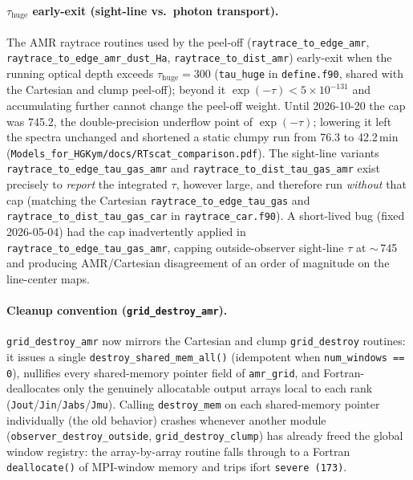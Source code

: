 \documentclass[english,a4paper]{my_memo}
\begin{document}
\begin{sloppypar}
\paragraph{$\tau_\mathrm{huge}$ early-exit (sight-line vs.\ photon
transport).}  The AMR raytrace routines used by the peel-off
(\texttt{raytrace\_to\_edge\_amr}, \texttt{raytrace\_to\_edge\_amr\_dust\_Ha},
\texttt{raytrace\_to\_dist\_amr}) early-exit when the running optical
depth exceeds $\tau_\mathrm{huge}=300$ (\texttt{tau\_huge} in
\texttt{define.f90}, shared with the Cartesian and clump peel-off);
beyond it $\exp(-\tau)<5\times10^{-131}$ and accumulating further cannot
change the peel-off weight.  Until 2026-10-20 the cap was 745.2, the
double-precision underflow point of $\exp(-\tau)$; lowering it left the
spectra unchanged and shortened a static clumpy run from 76.3 to
42.2\,min (\texttt{Models\_for\_HGKym/docs/RTscat\_comparison.pdf}).  The sight-line variants
\texttt{raytrace\_to\_edge\_tau\_gas\_amr} and
\texttt{raytrace\_to\_dist\_tau\_gas\_amr} exist precisely to
\emph{report} the integrated $\tau$, however large, and therefore run
\emph{without} that cap (matching the Cartesian
\texttt{raytrace\_to\_edge\_tau\_gas} and
\texttt{raytrace\_to\_dist\_tau\_gas\_car} in \texttt{raytrace\_car.f90}).
A short-lived bug (fixed 2026-05-04) had the cap inadvertently applied
in \texttt{raytrace\_to\_edge\_tau\_gas\_amr}, capping outside-observer
sight-line $\tau$ at $\sim$\,745 and producing AMR/Cartesian disagreement
of an order of magnitude on the line-center maps.
\end{sloppypar}

\begin{sloppypar}
\paragraph{Cleanup convention (\texttt{grid\_destroy\_amr}).}
\texttt{grid\_destroy\_amr} now mirrors the Cartesian and clump
\texttt{grid\_destroy} routines: it issues a single
\texttt{destroy\_shared\_mem\_all()} (idempotent when
\texttt{num\_windows == 0}), nullifies every shared-memory pointer
field of \texttt{amr\_grid}, and Fortran-deallocates only the genuinely
allocatable output arrays local to each rank
(\texttt{Jout}/\texttt{Jin}/\texttt{Jabs}/\texttt{Jmu}).  Calling
\texttt{destroy\_mem} on each shared-memory pointer individually (the
old behavior) crashes whenever another module
(\texttt{observer\_destroy\_outside}, \texttt{grid\_destroy\_clump})
has already freed the global window registry: the array-by-array routine
falls through to a Fortran \texttt{deallocate()} of MPI-window memory
and trips ifort \texttt{severe (173)}.
\end{sloppypar}
\end{document}
